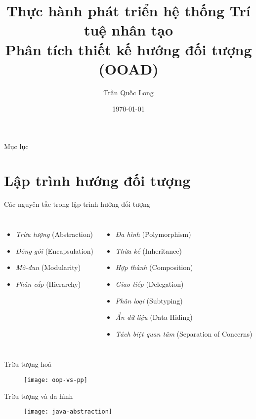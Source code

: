 \documentclass{beamer}
\title{Thực hành phát triển hệ thống Trí tuệ nhân tạo\\
Phân tích thiết kế hướng đối tượng (OOAD)
}
\author{Trần Quốc Long}
\institute{Trường ĐH Công nghệ, ĐHQG Hà Nội}
\date{\today}
\newcommand{\ul}[1]{\emph{#1}}
\begin{document}
\begin{frame}
    \titlepage
\end{frame}

\begin{frame}{Mục lục}
    \tableofcontents
\end{frame}

\section{Lập trình hướng đối tượng}

\begin{frame}{Các nguyên tắc trong lập trình hướng đối tượng}
    \begin{columns}
    \begin{itemize}
        \item \ul{Trừu tượng} (Abstraction)
        \item \ul{Đóng gói} (Encapsulation)
        \item \ul{Mô-đun} (Modularity)
        \item \ul{Phân cấp} (Hierarchy)
    \end{itemize}
    \begin{itemize}
        \item \ul{Đa hình} (Polymorphism)
        \item \ul{Thừa kế} (Inheritance)
        \item \ul{Hợp thành} (Composition)
        \item \ul{Giao tiếp} (Delegation)
        \item \ul{Phân loại} (Subtyping)
        \item \ul{Ẩn dữ liệu} (Data Hiding)
        \item \ul{Tách biệt quan tâm} (Separation of Concerns)
    \end{itemize}
    \end{columns}
\end{frame}

\begin{frame}{Trừu tượng hoá}
    \begin{figure}
        \centering
        \texttt{[image: oop-vs-pp]}
    \end{figure}
\end{frame}

\begin{frame}{Trừu tượng và đa hình}
    \begin{figure}
        \centering
        \texttt{[image: java-abstraction]}
    \end{figure}
\end{frame}
\end{document}
